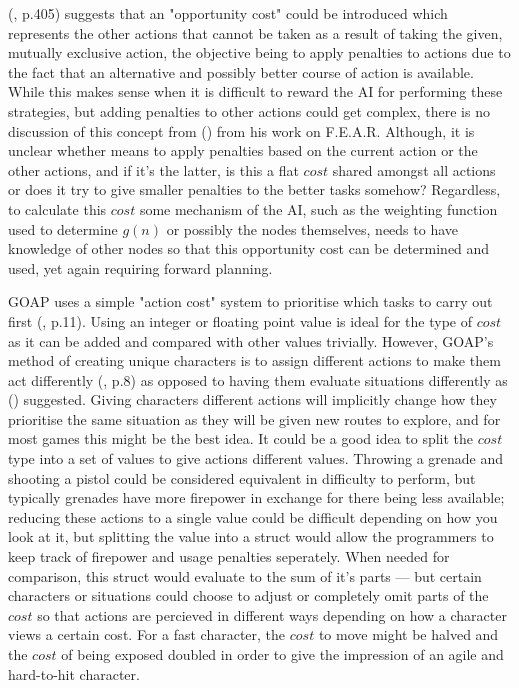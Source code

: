 \documentclass[11pt, a4paper]{article}
\begin{document}
\citeauthor{harmon2002economic} (\citeyear{harmon2002economic}, p.405) suggests that an "opportunity cost" could be introduced which represents the other actions that cannot be taken as a result of taking the given, mutually exclusive action, the objective being to apply penalties to actions due to the fact that an alternative and possibly better course of action is available. While this makes sense when it is difficult to reward the AI for performing these strategies, but adding penalties to other actions could get complex, there is no discussion of this concept from \citeauthor{orkin2006three} (\citeyear{orkin2006three}) from his work on F.E.A.R. Although, it is unclear whether \citeauthor{harmon2002economic} means to apply penalties based on the current action or the other actions, and if it's the latter, is this a flat $cost$ shared amongst all actions or does it try to give smaller penalties to the better tasks somehow? Regardless, to calculate this $cost$ some mechanism of the AI, such as the weighting function used to determine $g(n)$ or possibly the nodes themselves, needs to have knowledge of other nodes so that this opportunity cost can be determined and used, yet again requiring forward planning.

GOAP uses a simple "action cost" system to prioritise which tasks to carry out first (\cite{orkin2006three}, p.11). Using an integer or floating point value is ideal for the type of $cost$ as it can be added and compared with other values trivially. However, GOAP's method of creating unique characters is to assign different actions to make them act differently (\cite{orkin2006three}, p.8) as opposed to having them evaluate situations differently as \citeauthor{millington2019ai} (\citeyear{millington2019ai}) suggested. Giving characters different actions will implicitly change how they prioritise the same situation as they will be given new routes to explore, and for most games this might be the best idea. It could be a good idea to split the $cost$ type into a set of values to give actions different values. Throwing a grenade and shooting a pistol could be considered equivalent in difficulty to perform, but typically grenades have more firepower in exchange for there being less available; reducing these actions to a single value could be difficult depending on how you look at it, but splitting the value into a struct would allow the programmers to keep track of firepower and usage penalties seperately. When needed for comparison, this struct would evaluate to the sum of it's parts --- but certain characters or situations could choose to adjust or completely omit parts of the $cost$ so that actions are percieved in different ways depending on how a character views a certain cost. For a fast character, the $cost$ to move might be halved and the $cost$ of being exposed doubled in order to give the impression of an agile and hard-to-hit character.
\end{document}
